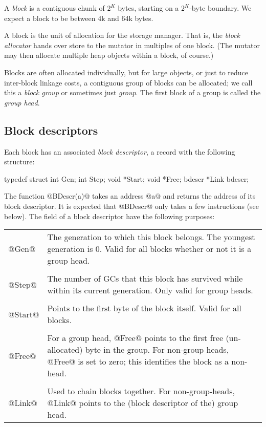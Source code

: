 \documentclass{article}
\newcommand{\block}{block}
\newcommand{\Block}{Block}
\begin{document}
A {\em \block} is a contiguous chunk of $2^K$ bytes, starting on a 
$2^K$-byte boundary.  We expect a \block{} to be between 4k and 64k bytes.

A \block{} is the unit of allocation for the storage manager.  That is,
the {\em block allocator} hands over store to the mutator in multiples of
one \block.  (The mutator may then allocate multiple heap objects within
a \block, of course.)

\Block{}s are often allocated individually, but for large
objects, or just to reduce inter-block linkage costs, a
contiguous group of \block{}s can be allocated; we call
this a {\em \block{} group} or sometimes just {\em group}.
The first \block{} of a group is called the {\em group head}.

\subsection{\Block{} descriptors}

Each block has an associated {\em block{} descriptor}, a
record with the following structure:
\begin{code}
  typedef struct {
	int Gen;
	int Step;
	void *Start;
	void *Free;
	bdescr *Link
    } bdescr;
\end{code}
The function @BDescr(a)@ takes an address @a@ and returns
the address of its block descriptor.  It is expected that 
@BDescr@ only takes a few instructions (see below).
The field of a \block{} descriptor have the following 
purposes:
\begin{center}
\begin{tabular}{lp{4.5in}}
@Gen@ & The generation to which this block belongs.  The 
youngest generation is 0. Valid for all blocks whether or not
it is a group head.
\\ \\
@Step@ & The number of GCs that this block has survived
while within its current generation. Only valid for group heads.
\\ \\
@Start@ & Points to the first byte of the block itself. 
Valid for all blocks.
\\ \\
@Free@ & For a group head, @Free@ points to the first free (un-allocated) 
byte in the group. For non-group heads, @Free@ is set to zero;
this identifies the \block{} as a non-head.
\\ \\
@Link@ & Used to chain \block{}s together.  For non-group-heads,
@Link@ points to the (\block{} descriptor of the) group head.
\end{tabular}
\end{center}
\end{document}
